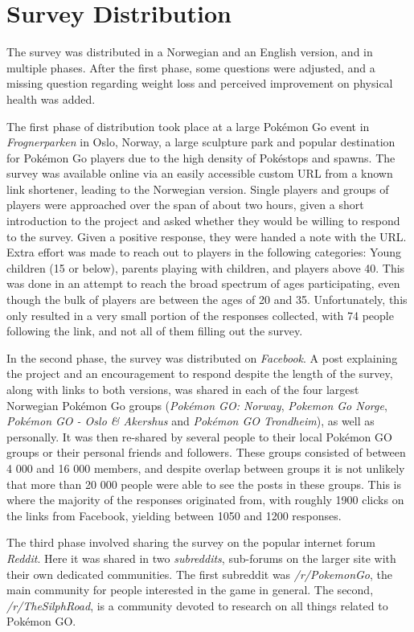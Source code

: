 \section{Survey Distribution}

The survey was distributed in a Norwegian and an English version, and in multiple phases. After the first phase, some questions were adjusted, and a missing question regarding weight loss and perceived improvement on physical health was added.

The first phase of distribution took place at a large Pokémon Go event in \emph{Frognerparken} in Oslo, Norway, a large sculpture park and popular destination for Pokémon Go players due to the high density of Pokéstops and spawns. The survey was available online via an easily accessible custom URL from a known link shortener, leading to the Norwegian version. Single players and groups of players were approached over the span of about two hours, given a short introduction to the project and asked whether they would be willing to respond to the survey. Given a positive response, they were handed a note with the URL. Extra effort was made to reach out to players in the following categories: Young children (15 or below), parents playing with children, and players above 40. This was done in an attempt to reach the broad spectrum of ages participating, even though the bulk of players are between the ages of 20 and 35. Unfortunately, this only resulted in a very small portion of the responses collected, with 74 people following the link, and not all of them filling out the survey.

In the second phase, the survey was distributed on \emph{Facebook}. A post explaining the project and an encouragement to respond despite the length of the survey, along with links to both versions, was shared in each of the four largest Norwegian Pokémon Go groups (\emph{Pokémon GO: Norway}, \emph{Pokemon Go Norge}, \emph{Pokémon GO - Oslo \& Akershus} and \emph{Pokémon GO Trondheim}), as well as personally. It was then re-shared by several people to their local Pokémon GO groups or their personal friends and followers. These groups consisted of between 4 000 and 16 000 members, and despite overlap between groups it is not unlikely that more than 20 000 people were able to see the posts in these groups. This is where the majority of the responses originated from, with roughly 1900 clicks on the links from Facebook, yielding between 1050 and 1200 responses.

The third phase involved sharing the survey on the popular internet forum \emph{Reddit}. Here it was shared in two \emph{subreddits}, sub-forums on the larger site with their own dedicated communities. The first subreddit was \emph{/r/PokemonGo}, the main community for people interested in the game in general. The second, \emph{/r/TheSilphRoad}, is a community devoted to research on all things related to Pokémon GO.

